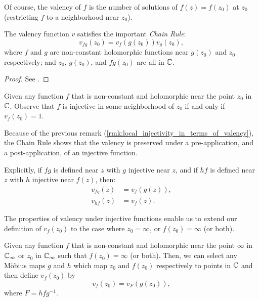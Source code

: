 \begin{remark}[$v_f(z_0)$ is the number of solutions of $f(z) = f(z_0)$]
    Of course, the valency of $f$ is the number of solutions of $f(z) = f(z_0)$
    at $z_0$ (restricting $f$ to a neighborhood near $z_0$).
\end{remark}

\begin{proposition}
    The valency function $v$ satisfies the important \emph{Chain Rule}:
    \begin{equation*}
        v_{fg}(z_0) = v_f(g(z_0))v_g(z_0),
    \end{equation*}
    where $f$ and $g$ are non-constant holomorphic functions near $g(z_0)$ and
    $z_0$ respectively; and $z_0$, $g(z_0)$, and $fg(z_0)$ are all in $\mathbb{C}$.
\end{proposition}
\begin{proof}
    See \cite[37--38]{Beardon1991}.
\end{proof}

\begin{remark}
    \label{rmk:local_injectivity_in_terms_of_valency}
    Given any function $f$ that is non-constant and holomorphic near the point
    $z_0$ in $\mathbb{C}$. Observe that $f$ is injective in some neighborhood of $z_0$
    if and only if $v_f(z_0) = 1$.
\end{remark}

\begin{remark}
    Because of the previous remark
    (\ref{rmk:local_injectivity_in_terms_of_valency}), the Chain Rule shows that
    the valency is preserved under a pre-application, and a post-application, of
    an injective function.

    Explicitly, if $fg$ is defined near $z$ with $g$ injective near $z$, and if
    $hf$ is defined near $z$ with $h$ injective near $f(z)$, then:
    \begin{align*}
        v_{fg}(z) &= v_f(g(z)), \\
        v_{hf}(z) &= v_f(z).
    \end{align*}
\end{remark}

The properties of valency under injective functions enable us to extend our
definition of $v_f(z_0)$ to the case where $z_0 = \infty$, or $f(z_0) = \infty$
(or both).

\begin{definition}
    \label{def:valency_in_ExtC}
    Given any function $f$ that is non-constant and holomorphic near the point
    $\infty$ in $\mathbb{C}_\infty$ or $z_0$ in $\mathbb{C}_\infty$ such that $f(z_0) = \infty$ (or
    both). Then, we can select any Möbius maps $g$ and $h$ which map $z_0$ and
    $f(z_0)$ respectively to points in $\mathbb{C}$ and then define $v_f(z_0)$ by
    \begin{equation*}
        v_f(z_0) = v_F(g(z_0)),
    \end{equation*}
    where $F = hfg^{-1}$.
\end{definition}

